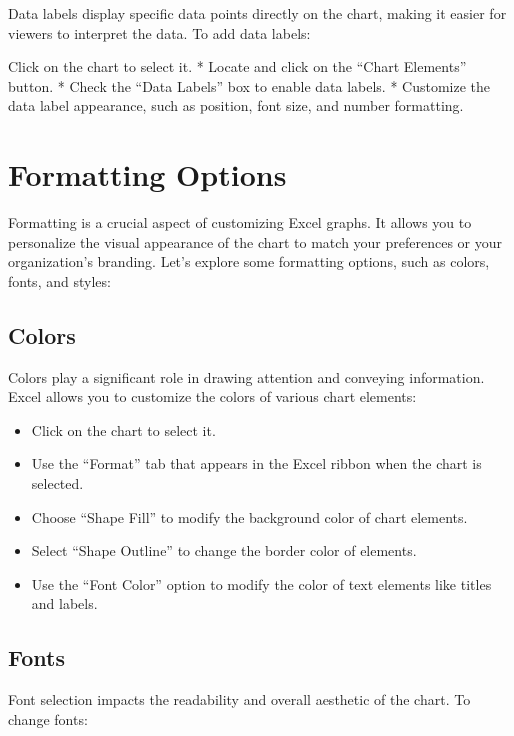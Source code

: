 \documentclass[
]{book}
\providecommand{\tightlist}{%
  \setlength{\itemsep}{0pt}\setlength{\parskip}{0pt}}
\begin{document}
Data labels display specific data points directly on the chart, making it easier for viewers to interpret the data. To add data labels:

Click on the chart to select it.
* Locate and click on the ``Chart Elements'' button.
* Check the ``Data Labels'' box to enable data labels.
* Customize the data label appearance, such as position, font size, and number formatting.

\hypertarget{formatting-options}{%
\section{Formatting Options}\label{formatting-options}}

Formatting is a crucial aspect of customizing Excel graphs. It allows you to personalize the visual appearance of the chart to match your preferences or your organization's branding. Let's explore some formatting options, such as colors, fonts, and styles:

\hypertarget{colors}{%
\subsection{Colors}\label{colors}}

Colors play a significant role in drawing attention and conveying information. Excel allows you to customize the colors of various chart elements:

\begin{itemize}
\tightlist
\item
  Click on the chart to select it.
\item
  Use the ``Format'' tab that appears in the Excel ribbon when the chart is selected.
\item
  Choose ``Shape Fill'' to modify the background color of chart elements.
\item
  Select ``Shape Outline'' to change the border color of elements.
\item
  Use the ``Font Color'' option to modify the color of text elements like titles and labels.
\end{itemize}

\hypertarget{fonts}{%
\subsection{Fonts}\label{fonts}}

Font selection impacts the readability and overall aesthetic of the chart. To change fonts:
\end{document}
